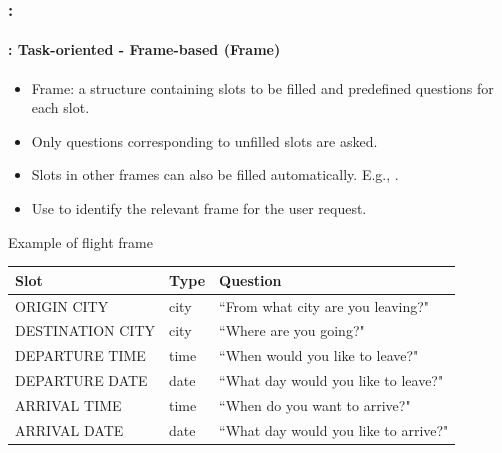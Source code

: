 \documentclass[xcolor=table]{beamer}
\begin{document}
\begin{frame}
	\frametitle{\insertshortsubtitle: \insertsection}
	\framesubtitle{\insertsubsection: Task-oriented - Frame-based (Frame)}
	
	\begin{itemize}
		\item Frame: a structure containing slots to be filled and predefined questions for each slot.
		\item Only questions corresponding to unfilled slots are asked.
		\item Slots in other frames can also be filled automatically. 
		E.g., .
		\item Use  to identify the relevant frame for the user request.
	\end{itemize}
	
	\vspace{-6pt}
	\begin{exampleblock}{Example of flight frame \cite{2020-jurafsky-martin}}
		\centering\tiny\bfseries
		\begin{tabular}{lll}
			\hline\hline
			Slot & Type & Question \\
			\hline
			ORIGIN CITY & city & ``From what city are you leaving?" \\
			DESTINATION CITY & city & ``Where are you going?" \\
			DEPARTURE TIME & time & ``When would you like to leave?" \\
			DEPARTURE DATE & date & ``What day would you like to leave?" \\
			ARRIVAL TIME & time & ``When do you want to arrive?" \\
			ARRIVAL DATE & date & ``What day would you like to arrive?" \\
			\hline\hline
		\end{tabular}
	\end{exampleblock}
	
\end{frame}
\end{document}
